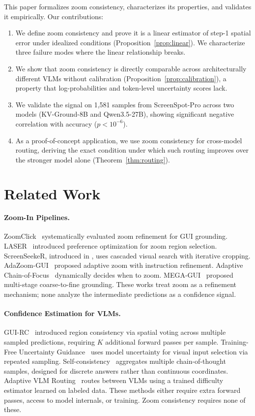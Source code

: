 \documentclass{article}
\begin{document}
This paper formalizes zoom consistency, characterizes its properties, and validates it empirically. Our contributions:

\begin{enumerate}
    \item We define zoom consistency and prove it is a linear estimator of step-1 spatial error under idealized conditions (Proposition~\ref{prop:linear}). We characterize three failure modes where the linear relationship breaks.
    \item We show that zoom consistency is directly comparable across architecturally different VLMs without calibration (Proposition~\ref{prop:calibration}), a property that log-probabilities and token-level uncertainty scores lack.
    \item We validate the signal on 1,581 samples from ScreenSpot-Pro across two models (KV-Ground-8B and Qwen3.5-27B), showing significant negative correlation with accuracy ($p < 10^{-6}$).
    \item As a proof-of-concept application, we use zoom consistency for cross-model routing, deriving the exact condition under which such routing improves over the stronger model alone (Theorem~\ref{thm:routing}).
\end{enumerate}

\section{Related Work}

\paragraph{Zoom-In Pipelines.}
ZoomClick~\cite{zoomclick} systematically evaluated zoom refinement for GUI grounding. LASER~\cite{laser} introduced preference optimization for zoom region selection. ScreenSeekeR, introduced in \citet{li2025screenspotpro}, uses cascaded visual search with iterative cropping. AdaZoom-GUI~\cite{adazoomgui} proposed adaptive zoom with instruction refinement. Adaptive Chain-of-Focus~\cite{adaptivecof} dynamically decides when to zoom. MEGA-GUI~\cite{megagui} proposed multi-stage coarse-to-fine grounding. These works treat zoom as a refinement mechanism; none analyze the intermediate predictions as a confidence signal.

\paragraph{Confidence Estimation for VLMs.}
GUI-RC~\cite{guirc} introduced region consistency via spatial voting across multiple sampled predictions, requiring $K$ additional forward passes per sample. Training-Free Uncertainty Guidance~\cite{uncertaintyguidance} uses model uncertainty for visual input selection via repeated sampling. Self-consistency~\cite{selfconsistency} aggregates multiple chain-of-thought samples, designed for discrete answers rather than continuous coordinates. Adaptive VLM Routing~\cite{avr} routes between VLMs using a trained difficulty estimator learned on labeled data. These methods either require extra forward passes, access to model internals, or training. Zoom consistency requires none of these.
\end{document}
